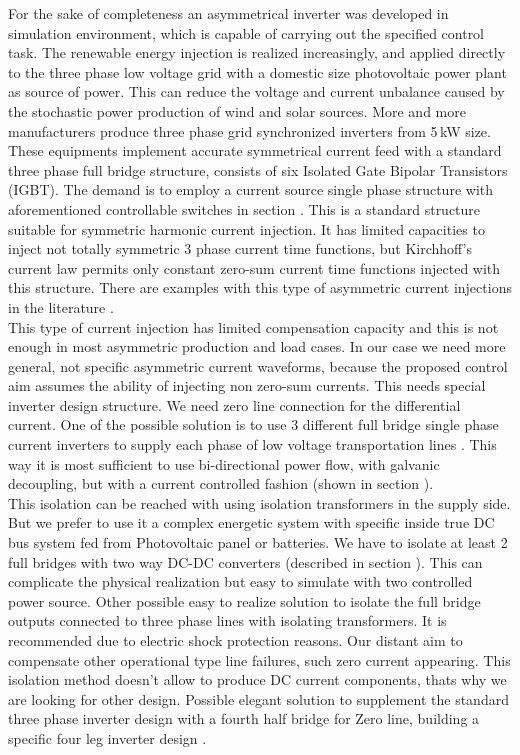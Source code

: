     For the sake of completeness an asymmetrical inverter was developed in simulation environment, which is capable of carrying out the specified control task. The renewable energy injection is realized increasingly, and applied directly to the three phase low voltage grid  with a domestic size photovoltaic power plant as source of power. This can reduce the voltage and current unbalance caused by the stochastic power production of wind and solar sources. More and more manufacturers produce three phase grid synchronized inverters from 5\,kW size. These equipments implement accurate symmetrical current feed with a standard three phase full bridge structure, consists of six Isolated Gate Bipolar Transistors (IGBT). The demand is to employ a current source single phase structure with aforementioned controllable switches in section . This is a standard structure suitable for symmetric harmonic current injection. It has limited capacities to inject not totally symmetric 3 phase current time functions, but Kirchhoff's current law permits only constant zero-sum current time functions injected with this structure. There are examples with this type of asymmetric current injections in the literature \cite{lee2009new}.\\
    This type of current injection has limited compensation capacity and this is not enough in most asymmetric production and load cases. In our case we need more general, not specific asymmetric current waveforms, because the proposed control aim assumes the ability of injecting non zero-sum currents. This needs special inverter design structure. We need zero line connection for the differential current. One of the possible solution is to use 3 different full bridge single phase current inverters to supply each phase of low voltage transportation lines \cite{Patnaik2013topologies}. This way it is most sufficient to use bi-directional power flow, with galvanic decoupling, but with a current controlled fashion (shown in section ).\\
    This isolation can be reached  with using isolation transformers in the supply side. But we prefer to use it a complex energetic system with specific inside true DC bus system fed from Photovoltaic panel or batteries. We have to isolate at least 2 full bridges with two way DC-DC converters (described in section ). This can complicate the physical realization but easy to simulate with two controlled power source. Other possible easy to realize solution to isolate the full bridge outputs  connected to three phase lines with isolating transformers. It is recommended due to electric shock protection reasons. Our distant aim to compensate other operational type line failures, such zero current appearing. This isolation method doesn't allow to produce DC current components, thats why we are looking for other design. Possible elegant solution to supplement the standard three phase inverter design with a fourth half bridge for Zero line, building a specific four leg inverter design \cite{Ninad2014control}.\\
